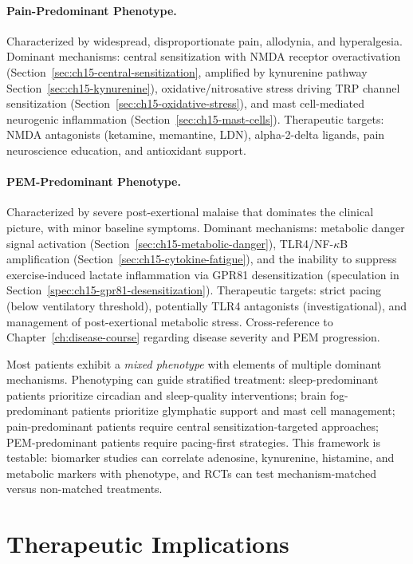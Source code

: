 \paragraph{Pain-Predominant Phenotype.} Characterized by widespread, disproportionate pain, allodynia, and hyperalgesia. Dominant mechanisms: central sensitization with NMDA receptor overactivation (Section~\ref{sec:ch15-central-sensitization}, amplified by kynurenine pathway Section~\ref{sec:ch15-kynurenine}), oxidative/nitrosative stress driving TRP channel sensitization (Section~\ref{sec:ch15-oxidative-stress}), and mast cell-mediated neurogenic inflammation (Section~\ref{sec:ch15-mast-cells}). Therapeutic targets: NMDA antagonists (ketamine, memantine, LDN), alpha-2-delta ligands, pain neuroscience education, and antioxidant support.

\paragraph{PEM-Predominant Phenotype.} Characterized by severe post-exertional malaise that dominates the clinical picture, with minor baseline symptoms. Dominant mechanisms: metabolic danger signal activation (Section~\ref{sec:ch15-metabolic-danger}), TLR4/NF-$\kappa$B amplification (Section~\ref{sec:ch15-cytokine-fatigue}), and the inability to suppress exercise-induced lactate inflammation via GPR81 desensitization (speculation in Section~\ref{spec:ch15-gpr81-desensitization}). Therapeutic targets: strict pacing (below ventilatory threshold), potentially TLR4 antagonists (investigational), and management of post-exertional metabolic stress. Cross-reference to Chapter~\ref{ch:disease-course} regarding disease severity and PEM progression.

Most patients exhibit a \emph{mixed phenotype} with elements of multiple dominant mechanisms. Phenotyping can guide stratified treatment: sleep-predominant patients prioritize circadian and sleep-quality interventions; brain fog-predominant patients prioritize glymphatic support and mast cell management; pain-predominant patients require central sensitization-targeted approaches; PEM-predominant patients require pacing-first strategies. This framework is testable: biomarker studies can correlate adenosine, kynurenine, histamine, and metabolic markers with phenotype, and RCTs can test mechanism-matched versus non-matched treatments.


\section{Therapeutic Implications}
\label{sec:ch15-therapeutic-implications}

